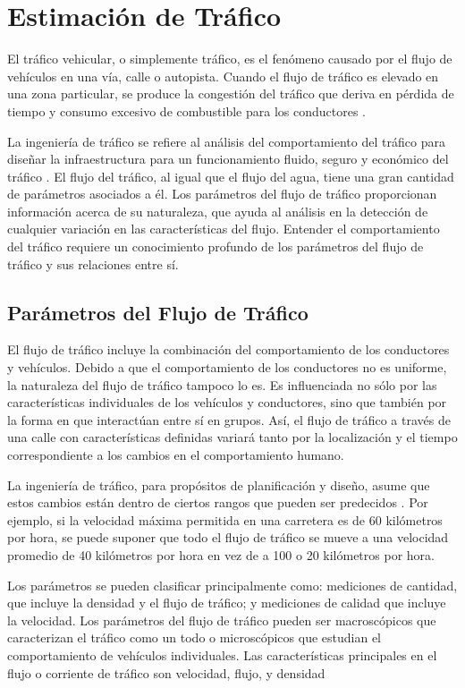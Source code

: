 \chapter{Estimación de Tráfico}
\label{cap:5}

El tráfico vehicular, o simplemente tráfico, es el fenómeno causado por el flujo de vehículos en una vía, calle o autopista. Cuando el flujo de tráfico es elevado en una zona particular, se produce la congestión del tráfico que deriva en pérdida de tiempo y consumo excesivo de combustible para los conductores \cite{litman2011smart}.

La ingeniería de tráfico se refiere al análisis del comportamiento del tráfico para diseñar la infraestructura para un funcionamiento fluido, seguro y económico del tráfico \cite{kadiyali1987traffic}. El flujo del tráfico, al igual que el flujo del agua, tiene una gran cantidad de parámetros asociados a él. Los parámetros del flujo de tráfico proporcionan información acerca de su naturaleza, que ayuda al análisis en la detección de cualquier variación en las características del flujo. Entender el comportamiento del tráfico requiere un conocimiento profundo de los parámetros del flujo de tráfico y sus relaciones entre sí.

\section{Parámetros del Flujo de Tráfico}

El flujo de tráfico incluye la combinación del comportamiento de los conductores y vehículos. Debido a que el comportamiento de los conductores no es uniforme, la naturaleza del flujo de tráfico tampoco lo es. Es influenciada no sólo por las características individuales de los vehículos y conductores, sino que también por la forma en que interactúan entre sí en grupos. Así, el flujo de tráfico a través de una calle con características definidas variará tanto por la localización y el tiempo correspondiente a los cambios en el comportamiento humano.

La ingeniería de tráfico, para propósitos de planificación y diseño, asume que estos cambios están dentro de ciertos rangos que pueden ser predecidos \cite{papacostas1987fundamentals}. Por ejemplo, si la velocidad máxima permitida en una carretera es de 60 kilómetros por hora, se puede suponer que todo el flujo de tráfico se mueve a una velocidad promedio de 40 kilómetros por hora en vez de a 100 o 20 kilómetros por hora. 

Los parámetros se pueden clasificar principalmente como: mediciones de cantidad, que incluye la densidad y el flujo de tráfico; y mediciones de calidad que incluye la velocidad. Los parámetros del flujo de tráfico pueden ser macroscópicos que caracterizan el tráfico como un todo o microscópicos que estudian el comportamiento de vehículos individuales. Las características principales en el flujo o corriente de tráfico son velocidad, flujo, y densidad \cite{may1990fundamentals}

